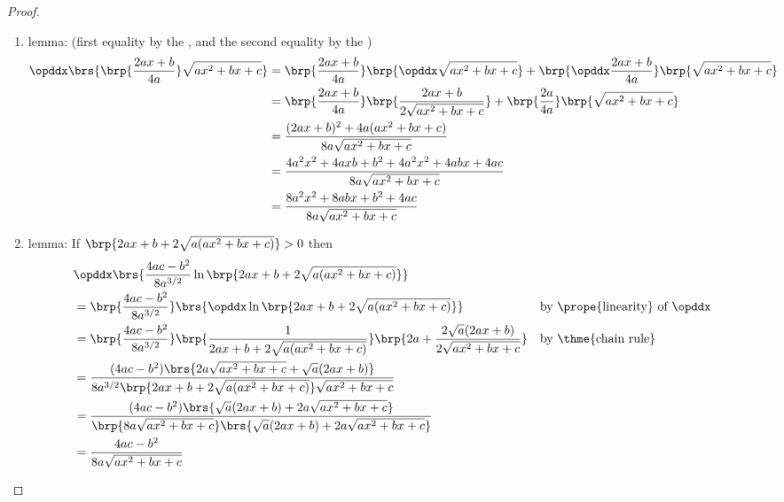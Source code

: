 \begin{proof}
\begin{enumerate}
  \item lemma: \label{item:abc_term1} 
        (first equality by the , and the second equality by the )
    \begin{align*}
      \opddx\brs{\brp{\frac{2ax+b}{4a}}\sqrt{ax^2+bx+c}} 
        &= \brp{      \frac{2ax+b}{4a}}\brp{\opddx\sqrt{ax^2+bx+c}} +
           \brp{\opddx\frac{2ax+b}{4a}}\brp{      \sqrt{ax^2+bx+c}} 
      \\&= \brp{\frac{2ax+b}{4a}} \brp{\frac{2ax+b}{2\sqrt{ax^2+bx+c}}} 
         + \brp{\frac{2a}   {4a}} \brp{\sqrt{ax^2+bx+c}}
      \\&= \frac{(2ax+b)^2 + 4a(ax^2+bx+c)}
                {8a\sqrt{ax^2+bx+c}}
      \\&= \frac{4a^2x^2 +4axb + b^2 + 4a^2x^2 + 4abx + 4ac}
                {8a\sqrt{ax^2+bx+c}}
      \\&= \frac{8a^2x^2 +8abx + b^2 + 4ac}
                {8a\sqrt{ax^2+bx+c}}
    \end{align*}

  \item lemma: \label{item:abc_lnpos} If $\brp{2ax+b+2\sqrt{a(ax^2+bx+c)}}>0$ then
    \begin{align*}
      &\opddx\brs{\frac{4ac-b^2}{8a^{3/2}}\ln\brp{2ax+b+2\sqrt{a(ax^2+bx+c)}}}
      \\&= \brp{\frac{4ac-b^2}{8a^{3/2}}}
           \brs{\opddx\ln\brp{2ax+b+2\sqrt{a(ax^2+bx+c)}}}
        && \text{by \prope{linearity} of $\opddx$}
      \\&= \brp{\frac{4ac-b^2}{8a^{3/2}}}
           \brp{\frac{1}{2ax+b+2\sqrt{a(ax^2+bx+c)}}}
           \brp{2a+\frac{2\sqrt{a}(2ax+b)}{2\sqrt{ax^2+bx+c}}}
        && \text{by \thme{chain rule}}
      \\&= \frac{(4ac-b^2)\brs{2a\sqrt{ax^2+bx+c} + \sqrt{a}(2ax+b)}}
                {8a^{3/2} \brp{2ax+b+2\sqrt{a(ax^2+bx+c)}} \sqrt{ax^2+bx+c}}
      \\&= \frac{(4ac-b^2)\brs{\sqrt{a}(2ax+b)+2a\sqrt{ax^2+bx+c}}}
                {\brp{8a\sqrt{ax^2+bx+c}}\brs{\sqrt{a}(2ax+b)+2a\sqrt{ax^2+bx+c}} }
      \\&= \frac{4ac-b^2}
                {8a\sqrt{ax^2+bx+c}}  %
    \end{align*}


\end{enumerate}
\end{proof}
